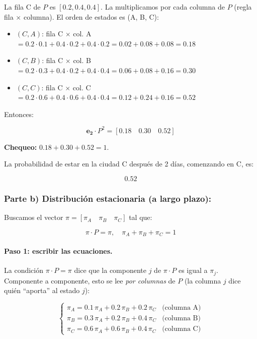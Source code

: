 \documentclass[a4paper,11pt]{article}
\begin{document}
La fila C de $P$ es $[0.2, 0.4, 0.4]$. La multiplicamos por cada columna de $P$ (regla fila $\times$ columna). El orden de estados es (A, B, C):

\begin{itemize}
    \item $(C,A)$: fila C $\times$ col. A $= 0.2 \cdot 0.1 + 0.4 \cdot 0.2 + 0.4 \cdot 0.2 = 0.02 + 0.08 + 0.08 = 0.18$
    \item $(C,B)$: fila C $\times$ col. B $= 0.2 \cdot 0.3 + 0.4 \cdot 0.2 + 0.4 \cdot 0.4 = 0.06 + 0.08 + 0.16 = 0.30$
    \item $(C,C)$: fila C $\times$ col. C $= 0.2 \cdot 0.6 + 0.4 \cdot 0.6 + 0.4 \cdot 0.4 = 0.12 + 0.24 + 0.16 = 0.52$
\end{itemize}

Entonces:

\[
\mathbf{e_2} \cdot P^2 = [0.18 \quad 0.30 \quad \boxed{0.52}]
\]

\textbf{Chequeo:} $0.18 + 0.30 + 0.52 = 1$. \checkmark

La probabilidad de estar en la ciudad C después de 2 días, comenzando en C, es:

\[
\boxed{0.52}
\]

\subsubsection{Parte b) Distribución estacionaria (a largo plazo):}

Buscamos el vector $\pi = [\pi_A \quad \pi_B \quad \pi_C]$ tal que:

\[
\pi \cdot P = \pi, \quad \pi_A + \pi_B + \pi_C = 1
\]

\paragraph{Paso 1: escribir las ecuaciones.} La condición $\pi \cdot P = \pi$ dice que la componente $j$ de $\pi \cdot P$ es igual a $\pi_j$. Componente a componente, esto se lee \emph{por columnas} de $P$ (la columna $j$ dice quién ``aporta'' al estado $j$):

\[
\begin{cases}
\pi_A = 0.1\,\pi_A + 0.2\,\pi_B + 0.2\,\pi_C & \text{(columna A)} \\
\pi_B = 0.3\,\pi_A + 0.2\,\pi_B + 0.4\,\pi_C & \text{(columna B)} \\
\pi_C = 0.6\,\pi_A + 0.6\,\pi_B + 0.4\,\pi_C & \text{(columna C)}
\end{cases}
\]
\end{document}

